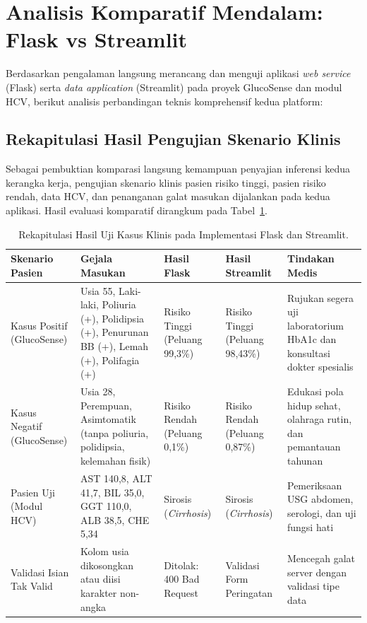 \documentclass[a4paper,oneside,12pt]{report}
\begin{document}
\section{Analisis Komparatif Mendalam: Flask vs Streamlit}
Berdasarkan pengalaman langsung merancang dan menguji aplikasi \textit{web service} (Flask) serta \textit{data application} (Streamlit) pada proyek GlucoSense dan modul HCV, berikut analisis perbandingan teknis komprehensif kedua platform:

\subsection{Rekapitulasi Hasil Pengujian Skenario Klinis}
Sebagai pembuktian komparasi langsung kemampuan penyajian inferensi kedua kerangka kerja, pengujian skenario klinis pasien risiko tinggi, pasien risiko rendah, data HCV, dan penanganan galat masukan dijalankan pada kedua aplikasi. Hasil evaluasi komparatif dirangkum pada Tabel~\ref{tab:rekapitulasi-uji-klinis}.

\begin{table}[H]
\centering
\caption{Rekapitulasi Hasil Uji Kasus Klinis pada Implementasi Flask dan Streamlit.}
\label{tab:rekapitulasi-uji-klinis}
\small
\setlength{\tabcolsep}{3.5pt}
\begin{tabularx}{\linewidth}{|>{\raggedright\arraybackslash}p{2.6cm}|>{\raggedright\arraybackslash}X|>{\centering\arraybackslash}p{2.2cm}|>{\centering\arraybackslash}p{2.2cm}|>{\raggedright\arraybackslash}X|}
\hline
\textbf{Skenario Pasien} & \textbf{Gejala Masukan} & \textbf{Hasil Flask} & \textbf{Hasil Streamlit} & \textbf{Tindakan Medis} \\
\hline
Kasus Positif (GlucoSense) & Usia 55, Laki-laki, Poliuria (+), Polidipsia (+), Penurunan BB (+), Lemah (+), Polifagia (+) & Risiko Tinggi (Peluang 99,3\%) & Risiko Tinggi (Peluang 98,43\%) & Rujukan segera uji laboratorium HbA1c dan konsultasi dokter spesialis \\
\hline
Kasus Negatif (GlucoSense) & Usia 28, Perempuan, Asimtomatik (tanpa poliuria, polidipsia, kelemahan fisik) & Risiko Rendah (Peluang 0,1\%) & Risiko Rendah (Peluang 0,87\%) & Edukasi pola hidup sehat, olahraga rutin, dan pemantauan tahunan \\
\hline
Pasien Uji (Modul HCV) & AST 140,8, ALT 41,7, BIL 35,0, GGT 110,0, ALB 38,5, CHE 5,34 & Sirosis (\textit{Cirrhosis}) & Sirosis (\textit{Cirrhosis}) & Pemeriksaan USG abdomen, serologi, dan uji fungsi hati \\
\hline
Validasi Isian Tak Valid & Kolom usia dikosongkan atau diisi karakter non-angka & Ditolak: 400 Bad Request & Validasi Form Peringatan & Mencegah galat server dengan validasi tipe data \\
\hline
\end{tabularx}
\end{table}
\end{document}
